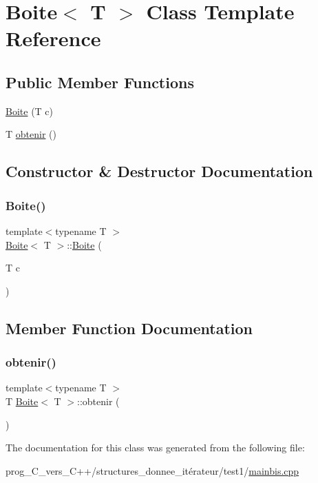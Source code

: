 \hypertarget{classBoite}{}\section{Boite$<$ T $>$ Class Template Reference}
\label{classBoite}
\subsection*{Public Member Functions}
\begin{DoxyCompactItemize}
\item 
\hyperlink{classBoite_ad48902a290af5abc22fac01087aafc06}{Boite} (T c)
\item 
T \hyperlink{classBoite_ad88f3d45227a9e4175008891c0d1af6c}{obtenir} ()
\end{DoxyCompactItemize}


\subsection{Constructor \& Destructor Documentation}
\mbox{\label{classBoite_ad48902a290af5abc22fac01087aafc06}} 
\subsubsection{\texorpdfstring{Boite()}{Boite()}}
{\footnotesize\ttfamily template$<$typename T $>$ \\
\hyperlink{classBoite}{Boite}$<$ T $>$\+::\hyperlink{classBoite}{Boite} (\begin{DoxyParamCaption}\item[{T}]{c }\end{DoxyParamCaption})\hspace{0.3cm}{\ttfamily [inline]}}



\subsection{Member Function Documentation}
\mbox{\label{classBoite_ad88f3d45227a9e4175008891c0d1af6c}} 
\subsubsection{\texorpdfstring{obtenir()}{obtenir()}}
{\footnotesize\ttfamily template$<$typename T $>$ \\
T \hyperlink{classBoite}{Boite}$<$ T $>$\+::obtenir (\begin{DoxyParamCaption}{ }\end{DoxyParamCaption})\hspace{0.3cm}{\ttfamily [inline]}}



The documentation for this class was generated from the following file\+:\begin{DoxyCompactItemize}
\item 
prog\+\_\+\+C\+\_\+vers\+\_\+\+C++/structures\+\_\+donnee\+\_\+itérateur/test1/\hyperlink{mainbis_8cpp}{mainbis.\+cpp}\end{DoxyCompactItemize}

